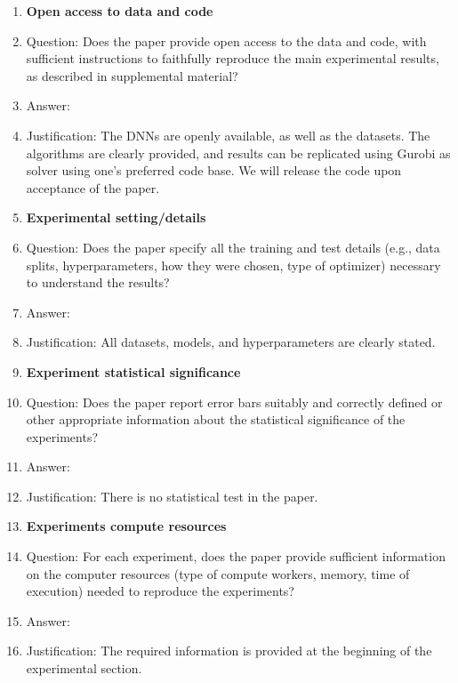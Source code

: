 \begin{enumerate}
	
	
	\item {\bf Open access to data and code}
	\item[] Question: Does the paper provide open access to the data and code, with sufficient instructions to faithfully reproduce the main experimental results, as described in supplemental material?
	\item[] Answer: \answerYes{} %
	\item[] Justification: The DNNs are openly available, as well as the datasets. The algorithms are clearly provided, and results can be replicated using Gurobi as solver using one's preferred code base. We will release the code upon acceptance of the paper.

	
	
	\item {\bf Experimental setting/details}
	\item[] Question: Does the paper specify all the training and test details (e.g., data splits, hyperparameters, how they were chosen, type of optimizer) necessary to understand the results?
	\item[] Answer: \answerYes{} %
	\item[] Justification: All datasets, models, and hyperparameters are clearly stated.

	
	\item {\bf Experiment statistical significance}
	\item[] Question: Does the paper report error bars suitably and correctly defined or other appropriate information about the statistical significance of the experiments?
	\item[] Answer:\answerNA{} %
	\item[] Justification: There is no statistical test in the paper.

	
	\item {\bf Experiments compute resources}
	\item[] Question: For each experiment, does the paper provide sufficient information on the computer resources (type of compute workers, memory, time of execution) needed to reproduce the experiments?
	\item[] Answer: \answerYes{} %
	\item[] Justification: The required information is provided at the beginning of the experimental section.


\end{enumerate}
